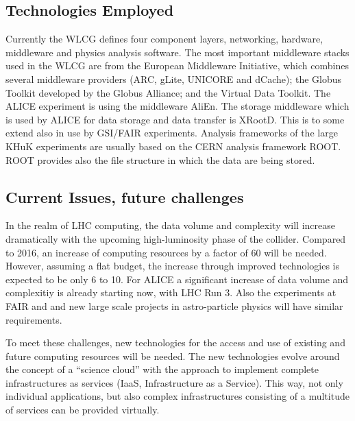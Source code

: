 \subsection{Technologies Employed}
Currently the WLCG defines four component layers,  networking, hardware, middleware and
physics analysis software. The most important middleware stacks used
in the WLCG are from the European Middleware Initiative, which
combines several middleware providers  (ARC, gLite, UNICORE and
dCache); the Globus Toolkit developed by the Globus Alliance; and the
Virtual Data Toolkit. The ALICE experiment is using the middleware
AliEn.
The storage middleware which is used by ALICE for data storage and data transfer is XRootD.
This is to some extend also in use by GSI/FAIR experiments.
Analysis frameworks of the large KHuK experiments are usually based on the CERN  analysis framework ROOT.
ROOT provides also the file structure in which the data are being stored.


\subsection{Current Issues, future challenges}
In the realm of LHC computing, the data volume and complexity will
increase dramatically with the upcoming high-luminosity phase of the
collider. Compared to 2016, an increase of computing resources by a
factor of 60 will be needed. However, assuming a flat budget, the
increase through improved technologies is expected to be only 6 to
10. 
For ALICE a significant increase of data volume and complexitiy is already starting now, with
LHC Run 3.
Also the
experiments at FAIR  and and new large scale projects in astro-particle
physics will have similar requirements. 

To meet these challenges, new technologies for the access and use of
existing and future computing resources will be needed. The new
technologies evolve around the concept of a ``science cloud'' with the
approach to implement complete infrastructures as services (IaaS,
Infrastructure as a Service). This way, not only individual
applications, but also complex infrastructures consisting of a
multitude of services can be provided virtually. 


